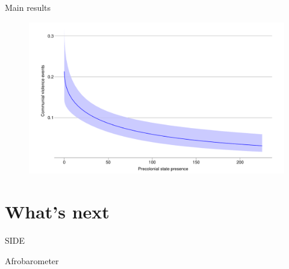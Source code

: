 \documentclass{beamer}
\begin{document}
\begin{frame}{Main results}

	\begin{figure}[htpb]
		\centering
		\includegraphics[width=0.8\linewidth]{../R/Output/CommunalViolenceMargins.pdf}
		\label{Margins}
	\end{figure}

\end{frame}

\section{What's next}

\begin{frame}{SIDE}

	

\end{frame}

\begin{frame}{Afrobarometer}

	

\end{frame}
\end{document}
